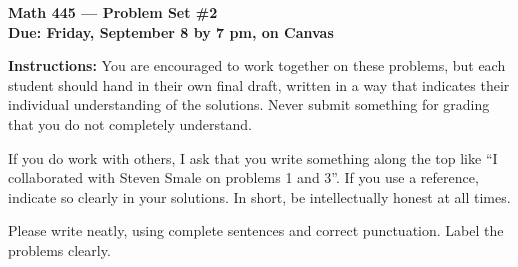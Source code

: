 \documentclass{amsart}
\begin{document}
\begin{center}
{\large\bfseries
Math 445 --- Problem Set \#2 \\
Due: Friday, September 8 by 7 pm, on Canvas}
\end{center}





{\bf Instructions:} You are encouraged to work together on these
problems, but each student should hand in their own final draft,
written in a way that indicates their individual understanding of
the solutions. Never submit something for grading
that you do not completely understand. 

If you do work with others, I ask that you write something along the
top like ``I collaborated with Steven Smale on problems 1 and 3''.
If you use a reference, indicate so clearly in your solutions. 
In short, be intellectually
honest at all times.

Please write neatly, using complete sentences and correct
punctuation. Label the problems clearly. 
\end{document}
